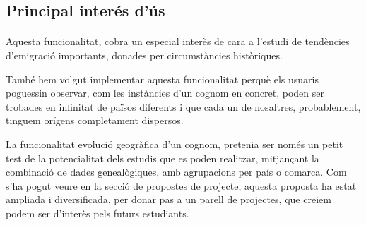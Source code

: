 \subsection{Principal interés d'ús}

\paragraph{}
Aquesta funcionalitat, cobra un especial interès de cara a l’estudi de tendències d'emigració importants, donades per circumstàncies històriques.

També hem volgut implementar aquesta funcionalitat perquè els usuaris poguessin observar, com les instàncies d'un cognom en concret, poden ser trobades en infinitat de països diferents i que cada un de nosaltres, probablement, tinguem orígens completament dispersos.

La funcionalitat evolució geogràfica d’un cognom, pretenia ser només un petit test de la potencialitat dels estudis que es poden realitzar, mitjançant la combinació de dades genealògiques, amb agrupacions per país o comarca. Com s’ha pogut veure en la secció de propostes de projecte, aquesta proposta ha estat ampliada i diversificada, per donar pas a un parell de projectes, que creiem podem ser d'interès pels futurs estudiants. 
